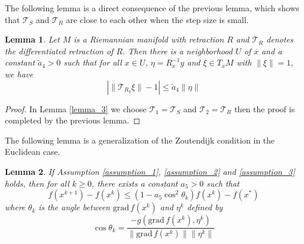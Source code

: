 \documentclass[12pt,a4paper,draft]{article}  %
\newtheorem{lemma}{Lemma}[section]
\theoremstyle{definition}
\numberwithin{equation}{section}
\newcommand{\grad}{\mathrm{grad}\,}
\newcommand{\VT}{\mathcal{T}}
\begin{document}
The following lemma is a direct consequence of the previous lemma, which shows that $\VT_S$ and $\VT_R$ are close to each other when the step size is small.
\begin{lemma}\label{lemma_4}
        Let $M$ is a Riemannian manifold with retraction $R$ and $\VT_R$ denotes the differentiated retraction of $R$. Then there is a neighborhood $U$ of $\overline{x}$ and a constant $\tilde{a}_4>0$ such that for all $x\in U$, $\eta = R_x^{-1}y$ and $\xi\in T_x M$ with $\|\xi\| = 1$, we have
        \begin{equation*}
                \left|\|\VT_{R_\eta}\xi\|-1\right|\leq \tilde{a}_4\|\eta\|
        \end{equation*}
\end{lemma}
\begin{proof}
        In Lemma \ref{lemma_3} we choose $\VT_1 = \VT_S$ and $\VT_2 = \VT_R$ then the proof is completed by the previous lemma.
\end{proof}
The following lemma is a generalization of the Zoutendijk condition in the Euclidean case.
\begin{lemma}\label{lemma_5}
        If Assumption \ref{assumption_1}, \ref{assumption_2} and \ref{assumption_3} holds, then for all $k\geq 0 $, there exists a constant $a_5>0$ such that
        \begin{equation*}
                f(x^{k+1}) - f(x^k) \leq (1-a_5\cos^2\theta_k)f(x^k) - f(x^\ast)
        \end{equation*}
        where $\theta_k$ is the angle between $\grad f(x^k)$ and $\eta^k$ defined by
        \[
        \cos\theta_k = \frac{-g(\grad f(x^k), \eta^k)}{\|\grad f(x^k)\|\|\eta^k\|}
        \]
\end{lemma}
\end{document}
